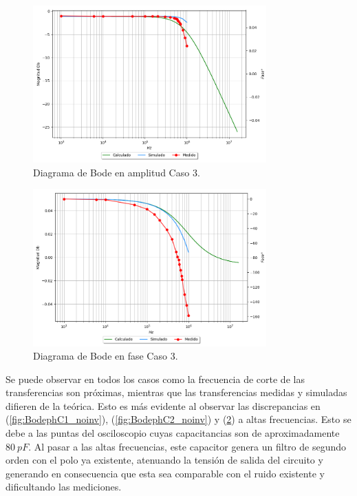 \begin{figure}[H]	
	\centering
	\includegraphics[width=0.8\textwidth, trim = {0 0 2cm 0},clip]{Ejercicio1/Imagenes/BodeC3_noinv.png}
	\caption{Diagrama de Bode en amplitud Caso 3.}
	\label{fig:BodeC3_noinv}
\end{figure} 
\begin{figure}[H]	
	\centering
	\includegraphics[width=0.8\textwidth, trim = {2.2cm 0 0 0},clip]{Ejercicio1/Imagenes/BodephC3_noinv.png}
	\caption{Diagrama de Bode en fase Caso 3.}
	\label{fig:BodephC3_noinv}
\end{figure} 

Se puede observar en todos los casos como la frecuencia de corte de las transferencias son próximas, mientras que las transferencias medidas y simuladas difieren de la teórica. Esto es más evidente al observar las discrepancias en (\ref{fig:BodephC1_noinv}), (\ref{fig:BodephC2_noinv}) y (\ref{fig:BodephC3_noinv}) a altas frecuencias. Esto se debe a las puntas del osciloscopio cuyas capacitancias son de aproximadamente $80 \ pF$. Al pasar a las altas frecuencias, este capacitor genera un filtro de segundo orden con el polo ya existente, atenuando la tensión de salida del circuito y generando en consecuencia que esta sea comparable con el ruido existente y dificultando las mediciones.

